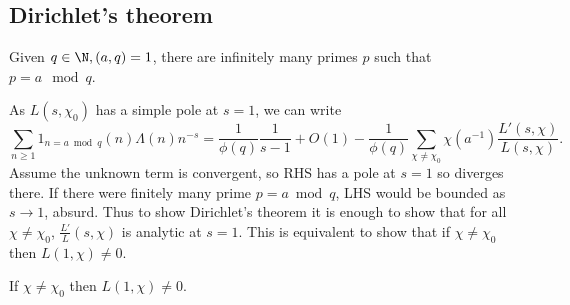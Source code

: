 \documentclass[a4paper]{article}
\theoremstyle{definition}
\begin{document}
\subsection{Dirichlet's theorem}

\begin{theorem}
  Given \(q \in \N, (a, q) = 1\), there are infinitely many primes \(p\) such that \(p = a \mod q\).
\end{theorem}

As \(L(s, \chi_0)\) has a simple pole at \(s = 1\), we can write
\[
  \sum_{n \geq 1} 1_{n = a \bmod q} (n) \Lambda(n) n^{-s}
  = \frac{1}{\phi(q)} \frac{1}{s - 1} + O(1) - \frac{1}{\phi(q)} \sum_{\chi \neq \chi_0} \chi(a^{-1}) \frac{L'(s, \chi)}{L(s, \chi)}.
\]
Assume the unknown term is convergent, so RHS has a pole at \(s = 1\) so diverges there. If there were finitely many prime \(p = a \bmod q\), LHS would be bounded as \(s \to 1\), absurd. Thus to show Dirichlet's theorem it is enough to show that for all \(\chi \neq \chi_0\), \(\frac{L'}{L} (s, \chi)\) is analytic at \(s = 1\). This is equivalent to show that if \(\chi \neq \chi_0\) then \(L(1, \chi) \neq 0\).

\begin{theorem}
  If \(\chi \neq \chi_0\) then \(L(1, \chi) \neq 0\).
\end{theorem}
\end{document}
